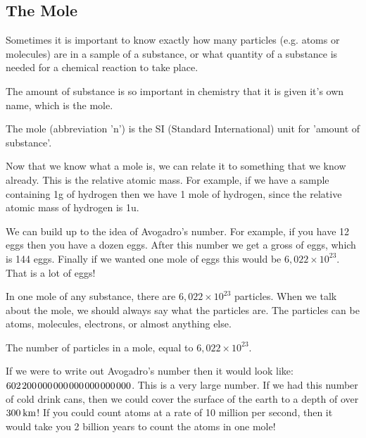             \subsection*{The Mole}
            \nopagebreak
      \label{m38717*id275573}Sometimes it is important to know exactly how many particles (e.g. atoms or molecules) are in a sample of a substance, or what quantity of a substance is needed for a chemical reaction to take place.\par 
\label{m38717*eip-872}The amount of substance is so important in chemistry that it is given it's own name, which is the mole.  \par \label{m38717*fhsst!!!underscore!!!id119}
 { \label{m38717*meaningfhsst!!!underscore!!!id119}
      \label{m38717*id275969}The mole (abbreviation 'n') is the SI (Standard International) unit for 'amount of substance'. \par 
       } 
\label{m38717*eip-392}Now that we know what a mole is, we can relate it to something that we know already. This is the relative atomic mass. For example, if we have a sample containing 1g of hydrogen then we have 1 mole of hydrogen, since the relative atomic mass of hydrogen is 1u.\par \label{m38717*eip-503}We can build up to the idea of Avogadro's number. For example, if you have 12 eggs then you have a dozen eggs. After this number we get a gross of eggs, which is 144 eggs. Finally if we wanted one mole of eggs this would be $6,022\ensuremath{\times}{10}^{23}$. That is a lot of eggs!\par \label{m38717*eip-460}In one mole of any substance, there are $6,022\ensuremath{\times}{10}^{23}$ particles. When we talk about the mole, we should always say what the particles are. The particles can be atoms, molecules, electrons, or almost anything else.\par \label{m38717*fhsst!!!underscore!!!id123}
 { \label{m38717*meaningfhsst!!!underscore!!!id123}
      \label{m38717*id276010}The number of particles in a mole, equal to $6,022\ensuremath{\times}{10}^{23}$. \par 
       } 
\label{m38717*eip-446}If we were to write out Avogadro's number then it would look like:
$602\phantom{\rule{1pt}{0ex}}200\phantom{\rule{1pt}{0ex}}000\phantom{\rule{1pt}{0ex}}000\phantom{\rule{1pt}{0ex}}000\phantom{\rule{1pt}{0ex}}000\phantom{\rule{1pt}{0ex}}000\phantom{\rule{1pt}{0ex}}000$. This is a very large number. If we had this number of cold drink cans, then we could cover the surface of the earth to a depth of over $300\phantom{\rule{2pt}{0ex}}\mathrm{km}$! If you could count atoms at a rate of 10 million per second, then it would take you 2 billion years to count the atoms in one mole!\par \label{m38717*notfhsst!!!underscore!!!id126}
